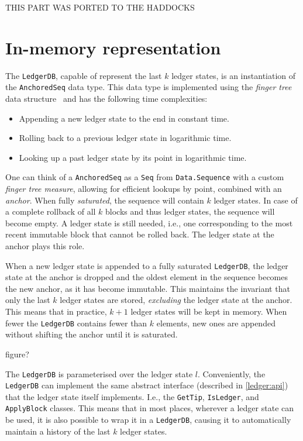 
THIS PART WAS PORTED TO THE HADDOCKS

\section{In-memory representation}
\label{ledgerdb:in-memory}

The \lstinline!LedgerDB!, capable of represent the last $k$ ledger states, is an
instantiation of the \lstinline!AnchoredSeq! data type. This data type is
implemented using the \emph{finger tree} data structure~\cite{fingertrees} and
has the following time complexities:

\begin{itemize}
\item Appending a new ledger state to the end in constant time.
\item Rolling back to a previous ledger state in logarithmic time.
\item Looking up a past ledger state by its point in logarithmic time.
\end{itemize}

One can think of a \lstinline!AnchoredSeq! as a \lstinline!Seq! from
\lstinline!Data.Sequence! with a custom \emph{finger tree measure}, allowing for
efficient lookups by point, combined with an \emph{anchor}. When fully
\emph{saturated}, the sequence will contain $k$ ledger states. In case of a
complete rollback of all $k$ blocks and thus ledger states, the sequence will
become empty. A ledger state is still needed, i.e., one corresponding to the
most recent immutable block that cannot be rolled back. The ledger state at the
anchor plays this role.

When a new ledger state is appended to a fully saturated \lstinline!LedgerDB!,
the ledger state at the anchor is dropped and the oldest element in the sequence
becomes the new anchor, as it has become immutable. This maintains the invariant
that only the last $k$ ledger states are stored, \emph{excluding} the ledger
state at the anchor. This means that in practice, $k + 1$ ledger states will be
kept in memory. When fewer the \lstinline!LedgerDB! contains fewer than $k$
elements, new ones are appended without shifting the anchor until it is
saturated.

 figure?

The \lstinline!LedgerDB! is parameterised over the ledger state $l$.
Conveniently, the \lstinline!LedgerDB! can implement the same abstract interface
(described in \cref{ledger:api}) that the ledger state itself implements. I.e.,
the \lstinline!GetTip!, \lstinline!IsLedger!, and \lstinline!ApplyBlock!
classes. This means that in most places, wherever a ledger state can be used, it
is also possible to wrap it in a \lstinline!LedgerDB!, causing it to
automatically maintain a history of the last $k$ ledger states.

